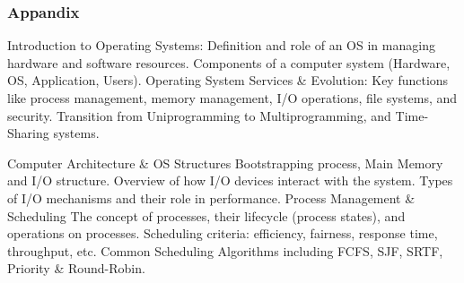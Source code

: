 \subsubsection{Appandix}
Introduction to Operating Systems:
Definition and role of an OS in managing hardware and software resources.
Components of a computer system (Hardware, OS, Application, Users).
Operating System Services \& Evolution:
Key functions like process management, memory management, I/O operations, file systems, and security.
Transition from Uniprogramming to Multiprogramming, and Time-Sharing systems.

Computer Architecture \& OS Structures
Bootstrapping process, Main Memory and I/O structure.
Overview of how I/O devices interact with the system.
Types of I/O mechanisms and their role in performance.
Process Management \& Scheduling
The concept of processes, their lifecycle (process states), and operations on processes.
Scheduling criteria: efficiency, fairness, response time, throughput, etc.
Common Scheduling Algorithms including FCFS, SJF, SRTF, Priority \& Round-Robin.